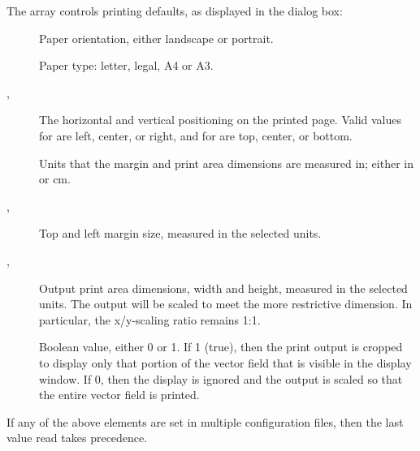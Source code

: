 The  array controls printing defaults, as displayed in
the  dialog box:
\begin{description}
\item[]
 Paper orientation, either landscape or portrait.
\item[]
 Paper type: letter, legal, A4 or A3.
\item[, ]
 The horizontal and vertical positioning on the printed page.  Valid
 values for  are left, center, or right, and for  are
 top, center, or bottom.
\item[]
 Units that the margin and print area dimensions are measured in;
 either in or cm.
\item[, ]
 Top and left margin size, measured in the selected units.
\item[, ]
 Output print area dimensions, width and height, measured in the
 selected units.  The output will be scaled to meet the more restrictive
 dimension.  In particular, the x/y-scaling ratio remains 1:1.
\item[]
 Boolean value, either 0 or 1.  If 1 (true), then the print
 output is cropped to display only that portion of the vector field that
 is visible in the display window.  If 0, then the display is ignored
 and the output is scaled so that the entire vector field is printed.
\end{description}

If any of the above elements are set in multiple configuration files,
then the last value read takes precedence.

